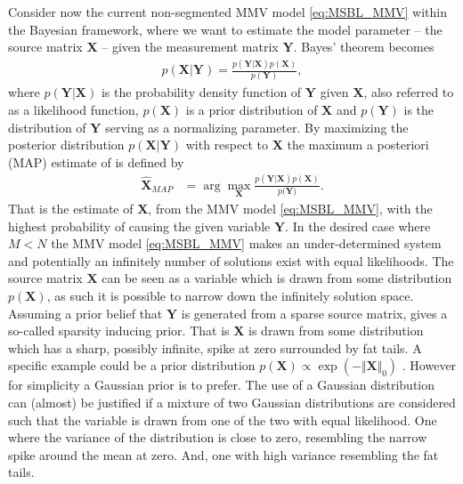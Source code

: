 Consider now the current non-segmented MMV model \eqref{eq:MSBL_MMV} within the Bayesian framework, where we want to estimate the model parameter -- the source matrix $\textbf{X}$ -- given the measurement matrix $\textbf{Y}$.   
Bayes' theorem becomes 
\begin{align*}
p(\mathbf{X}|\mathbf{Y}) = \frac{p(\mathbf{Y}|\mathbf{X}) p(\mathbf{X})}{p(\mathbf{Y})},
\end{align*}  
where $p(\mathbf{Y}|\mathbf{X})$ is the probability density function of $\mathbf{Y}$ given $\mathbf{X}$, also referred to as a likelihood function, $p(\mathbf{X})$ is a prior distribution of $\mathbf{X}$ and $p(\mathbf{Y})$ is the distribution of $\mathbf{Y}$ serving as a normalizing parameter.
By maximizing the posterior distribution $p(\mathbf{X}|\mathbf{Y})$ with respect to $\mathbf{X}$ the maximum a posteriori (MAP) estimate of is defined  by
\begin{align*}
\hat{\mathbf{X}}_{MAP} &= \arg \max_{\mathbf{X}} \frac{p(\mathbf{Y} \vert \mathbf{X}) p(\mathbf{X})}{p(\mathbf{Y)}}.
\end{align*}
That is the estimate of $\mathbf{X}$, from the MMV model \eqref{eq:MSBL_MMV}, with the highest probability of causing the given variable $\mathbf{Y}$.
In the desired case where $M < N$ the MMV model \eqref{eq:MSBL_MMV} makes an under-determined system and potentially an infinitely number of solutions exist with equal likelihoods.  
The source matrix $\mathbf{X}$ can be seen as a variable which is drawn from some distribution $p(\mathbf{X})$, as such it is possible to narrow down the infinitely solution space. 
Assuming a prior belief that $\mathbf{Y}$ is generated from a sparse source matrix, gives a so-called sparsity inducing prior. 
That is $\mathbf{X}$ is drawn from some distribution which has a sharp, possibly infinite, spike at zero surrounded by fat tails.
A specific example could be a prior distribution $p(\mathbf{X}) \propto \exp \left( - \Vert \mathbf{X} \Vert_0\right)$ \cite[p. 14]{phd_wipf}. However for simplicity a Gaussian prior is to prefer. The use of a Gaussian distribution can (almost) be justified if a mixture of two Gaussian distributions are considered such that the variable is drawn from one of the two with equal likelihood. One where the variance of the distribution is close to zero, resembling the narrow spike around the mean at zero. And, one with high variance resembling the fat tails.       

